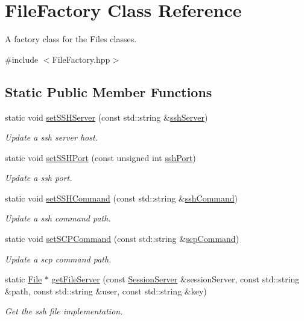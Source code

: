 \hypertarget{classFileFactory}{
\section{FileFactory Class Reference}
\label{classFileFactory}
}


A factory class for the Files classes.  




{\ttfamily \#include $<$FileFactory.hpp$>$}

\subsection*{Static Public Member Functions}
\begin{DoxyCompactItemize}
\item 
static void \hyperlink{classFileFactory_af2d30140299b916e71242d9f502ee49e}{setSSHServer} (const std::string \&\hyperlink{classFileFactory_a61ce1e766e2bb232e87409a245519d92}{sshServer})
\begin{DoxyCompactList}\small\item\em Update a ssh server host. \item\end{DoxyCompactList}\item 
static void \hyperlink{classFileFactory_a53b0aa4df40e44e7ef2d7b2e618e69a4}{setSSHPort} (const unsigned int \hyperlink{classFileFactory_a6922ca90dccd07b6532f4e5b41a5af62}{sshPort})
\begin{DoxyCompactList}\small\item\em Update a ssh port. \item\end{DoxyCompactList}\item 
static void \hyperlink{classFileFactory_a58947a53e9d878bad0586f028df7375b}{setSSHCommand} (const std::string \&\hyperlink{classFileFactory_ab422f5811ac3c7ebc908fef58a2fbfe3}{sshCommand})
\begin{DoxyCompactList}\small\item\em Update a ssh command path. \item\end{DoxyCompactList}\item 
static void \hyperlink{classFileFactory_ab2acfafdd415b00e9eca6e4e97440a74}{setSCPCommand} (const std::string \&\hyperlink{classFileFactory_a7784b65fe8efa6fbb1370516fefbdc7a}{scpCommand})
\begin{DoxyCompactList}\small\item\em Update a scp command path. \item\end{DoxyCompactList}\item 
static \hyperlink{classFile}{File} $\ast$ \hyperlink{classFileFactory_a198b53121ac8988aeb90a2e309ef767d}{getFileServer} (const \hyperlink{classSessionServer}{SessionServer} \&sessionServer, const std::string \&path, const std::string \&user, const std::string \&key)
\begin{DoxyCompactList}\small\item\em Get the ssh file implementation. \item\end{DoxyCompactList}\end{DoxyCompactItemize}
